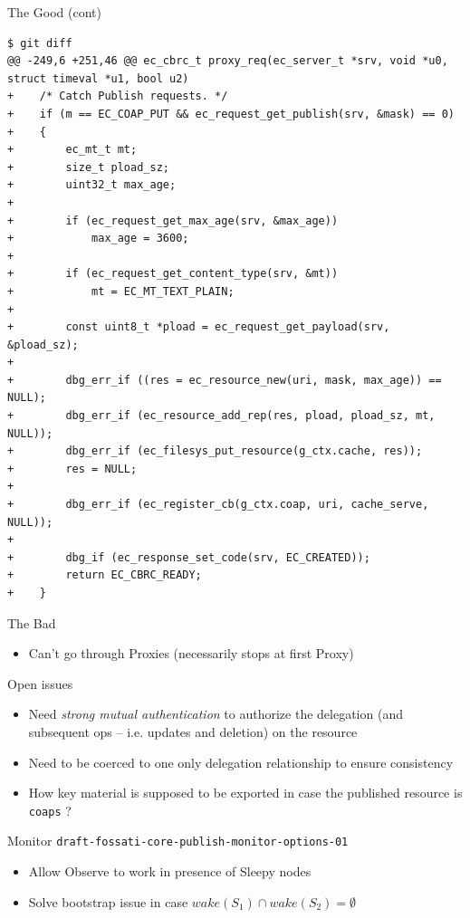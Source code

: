 \documentclass{beamer}
\begin{document}
\begin{frame}[fragile]{The Good (cont)}


{\tiny 
\begin{verbatim}
$ git diff
@@ -249,6 +251,46 @@ ec_cbrc_t proxy_req(ec_server_t *srv, void *u0, struct timeval *u1, bool u2)
+    /* Catch Publish requests. */
+    if (m == EC_COAP_PUT && ec_request_get_publish(srv, &mask) == 0)
+    {
+        ec_mt_t mt;
+        size_t pload_sz;
+        uint32_t max_age;
+
+        if (ec_request_get_max_age(srv, &max_age))
+            max_age = 3600;
+
+        if (ec_request_get_content_type(srv, &mt))
+            mt = EC_MT_TEXT_PLAIN;
+
+        const uint8_t *pload = ec_request_get_payload(srv, &pload_sz);
+
+        dbg_err_if ((res = ec_resource_new(uri, mask, max_age)) == NULL);
+        dbg_err_if (ec_resource_add_rep(res, pload, pload_sz, mt, NULL));
+        dbg_err_if (ec_filesys_put_resource(g_ctx.cache, res));
+        res = NULL;
+
+        dbg_err_if (ec_register_cb(g_ctx.coap, uri, cache_serve, NULL));
+
+        dbg_if (ec_response_set_code(srv, EC_CREATED));
+        return EC_CBRC_READY;        
+    }
\end{verbatim}
}
\end{frame}

\begin{frame}{The Bad}
\begin{itemize}
 \item Can't go through Proxies (necessarily stops at first Proxy)
\end{itemize}
\end{frame}

\begin{frame}{Open issues}

\begin{itemize}
 \item Need \emph{strong mutual authentication} to authorize the delegation (and subsequent ops -- i.e. updates and deletion) on the resource
 \item Need to be coerced to one only delegation relationship to ensure consistency
 \item How key material is supposed to be exported in case the published resource is \texttt{coaps} ?
\end{itemize}

\end{frame}

\begin{frame}{Monitor \hspace{5cm} {\tiny \texttt{draft-fossati-core-publish-monitor-options-01}}}

\begin{itemize}
 \item Allow Observe to work in presence of Sleepy nodes %
 \item Solve bootstrap issue in case {\scriptsize $wake(S_1) \cap wake(S_2) = \emptyset$}
\end{itemize}

\end{frame}
\end{document}
